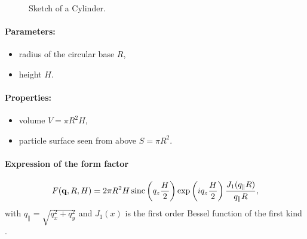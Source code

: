 \begin{figure}[ht]
\hfill
{}
\hfill
{}
\hfill
\caption{Sketch of a Cylinder.}
\label{fig:cylinder}
\end{figure}

\paragraph{Parameters:}
\begin{itemize}
\item radius of the circular base $R$, 
\item height $H$.
\end{itemize}

\paragraph{Properties:}
\begin{itemize}
\item volume $V = \pi R^2 H$,
\item particle surface seen from above $S=\pi R^2$.

\end{itemize}

\paragraph{Expression of the form factor}
  \begin{equation*}
F(\mathbf{q},R, H)=  2\pi
 R^2 H  \operatorname{sinc}\left(q_ z \frac{H}{2}\right) \exp\left(i q_ z \frac{H}{2}\right) \frac{J_1(q_{\parallel} R )}{q_{\parallel} R },
 \end{equation*}
with $q_{\parallel}=\sqrt{q_x^2+q_y^2}$ and $J_1(x)$ is the first order
Bessel function of the first kind \cite{AbSt64}.

